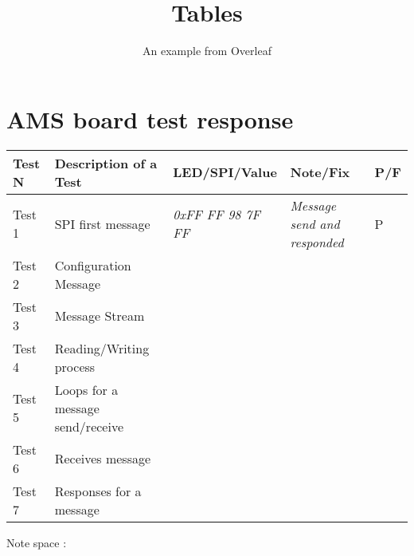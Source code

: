 \documentclass{article}
\title{Tables}
\author{An example from Overleaf}
\begin{document}
\section*{AMS board test response}
\begin{tabular}{ | m{1.3cm} | m{5cm} | m{4cm}| m{6cm}| m{0.6cm} | } 
  \hline
  \textbf{Test N}& \textbf{Description of a Test} & \textbf{LED/SPI/Value} & \textbf{Note/Fix} & \textbf{P/F}  \\ 
  \hline
  Test 1 & SPI first message & \textit{0xFF FF 98 7F FF} & \textit{Message send and responded} & P \\ 
  \hline
  Test 2 & Configuration Message  \newline  &  & &  \\ 
  \hline
  Test 3 & Message Stream  \newline  &  & &  \\ 
  \hline
  Test 4 & Reading/Writing process  \newline  &  & &  \\ 
  \hline
  Test 5 & Loops for a message send/receive  \newline  &  & &  \\ 
  \hline
  Test 6 & Receives message  \newline  &  & &  \\ 
  \hline
  Test 7 & Responses for a message  \newline  &  & &  \\ 
  \hline
\end{tabular}
Note space :
\end{document}
